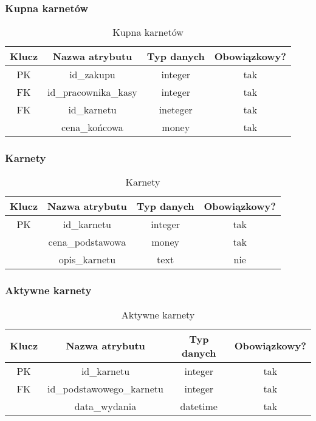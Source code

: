 \subsubsection{Kupna karnetów}
\begin{table}[H]
	\centering
	\begin{tabular}{|c|c|c|c|}
		\hline
		Klucz & Nazwa atrybutu       & Typ danych & Obowiązkowy? \\ \hline
		PK    & id\_zakupu           & integer    & tak           \\ \hline
		FK    & id\_pracownika\_kasy & integer    & tak           \\ \hline
		FK    & id\_karnetu          & ineteger   & tak           \\ \hline
		      & cena\_końcowa       & money      & tak           \\ \hline
	\end{tabular}
	\caption{Kupna karnetów}
\end{table}

\subsubsection{Karnety}
\begin{table}[H]
	\centering
	\begin{tabular}{|c|c|c|c|}
		\hline
		Klucz & Nazwa atrybutu   & Typ danych & Obowiązkowy? \\ \hline
		PK    & id\_karnetu      & integer    & tak           \\ \hline
		      & cena\_podstawowa & money      & tak           \\ \hline
		      & opis\_karnetu    & text       & nie           \\ \hline
	\end{tabular}
	\caption{Karnety}
\end{table}

\subsubsection{Aktywne karnety}
\begin{table}[H]
	\centering
	\begin{tabular}{|c|c|c|c|}
		\hline
		Klucz & Nazwa atrybutu            & Typ danych & Obowiązkowy? \\ \hline
		PK    & id\_karnetu               & integer    & tak           \\ \hline
		FK    & id\_podstawowego\_karnetu & integer    & tak           \\ \hline
		      & data\_wydania             & datetime   & tak           \\ \hline
	\end{tabular}
	\caption{Aktywne karnety}
\end{table}

